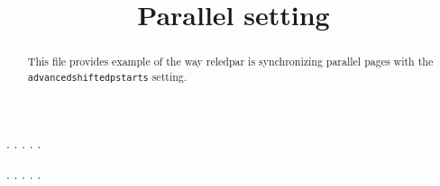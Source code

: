 \documentclass[a5paper,12pt]{article}
\begin{document}
\large

\date{}
\title{Parallel setting}
\maketitle

\begin{abstract}
This file provides example of the way reledpar is synchronizing parallel pages with the \verb+advancedshiftedpstarts+ setting.
\end{abstract}


\begin{pages}
    \begin{Leftside}
        \beginnumbering
            . \blindtext[21]
            \pend{}. \blindtext[10]
            \pend{}. \blindtext[6]
            \pend{}. \blindtext[6]
            \pend
            . \blindtext[6]
            \pend
        \endnumbering
    \end{Leftside}
    \begin{Rightside}
        \beginnumbering
            . \blindtext[22]\footnoteAmk
            \pend{}. \blindtext[12]
            \pend{}. \blindtext[12]
            \pend
            . \blindtext[12]
            \pend
            . \blindtext[12]
            \pend
        \endnumbering
    \end{Rightside}
\end{pages}
\Pages
\end{document}
